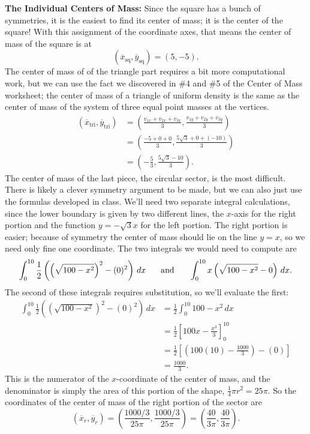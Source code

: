 \documentclass[12pt]{amsart}
\begin{document}
{\bf The Individual Centers of Mass:} Since the square has a bunch of symmetries, it is the easiest to find its center of mass; it is the center of the square!  With this assignment of the coordinate axes, that means the center of mass of the square is at $$\left(\overline{x}_{\text{sq}}, \overline{y}_{\text{sq}}\right) = (5,-5).$$
The center of mass of of the triangle part requires a bit more computational work, but we can use the fact we discovered in \#4 and \#5 of the Center of Mass worksheet; the center of mass of a triangle of uniform density is the same as the center of mass of the system of three equal point masses at the vertices.
\begin{align*}
(\overline{x}_{\text{tri}}, \overline{y}_{\text{tri}}) &  = \left(\frac{v_{1x} + v_{2x} + v_{3x}}{3}, \frac{v_{1y} + v_{2y} + v_{3y}}{3} \right)\\
& =\left(\frac{-5 + 0 + 0}{3},\frac{5\sqrt{3} + 0 + (-10)}{3} \right)\\
& = \left(-\frac{5}{3}, \frac{5\sqrt{3} - 10}{3}\right).
\end{align*}
The center of mass of the last piece, the circular sector, is the most difficult. There is likely a clever symmetry argument to be made, but we can also just use the formulas developed in class.  We'll need two separate integral calculations, since the lower boundary is given by two different lines, the $x$-axis for the right portion and the function $y = -\sqrt{3}x$ for the left portion.  The right portion is easier; because of symmetry the center of mass should lie on the line $y = x$, so we need only fine one coordinate.  The two integrals we would need to compute are $$\int_0^{10} \frac{1}{2}\left(\left(\sqrt{100 - x^2}\right)^2 - (0)^2\right)\,dx \hspace{.2in} \text{ and } \hspace{.2in} \int_0^{10} x\left(\sqrt{100 - x^2} - 0\right)\,dx.$$
The second of these integrals requires substitution, so we'll evaluate the first:
\begin{align*}
\int_0^{10} \frac{1}{2}\left(\left(\sqrt{100 - x^2}\right)^2 - (0)^2\right)\,dx & = \frac{1}{2}\int_0^{10} 100 - x^2\,dx\\
& = \frac{1}{2}\left[100x - \frac{x^3}{3}\right]_0^{10}\\
& = \frac{1}{2}\left[\left(100(10) - \frac{1000}{3}\right) - \left(0\right)\right]\\
& = \frac{1000}{3}.
\end{align*}
This is the numerator of the $x$-coordinate of the center of mass, and the denominator is simply the area of this portion of the shape, $\frac{1}{4}\pi r^2 = 25\pi$.  So the coordinates of the center of mass of the right portion of the sector are $$\left(\overline{x}_r, \overline{y}_r\right) = \left(\frac{1000/3}{25\pi}, \frac{1000/3}{25\pi}\right) = \left(\frac{40}{3\pi}, \frac{40}{3\pi}\right).$$
\end{document}
